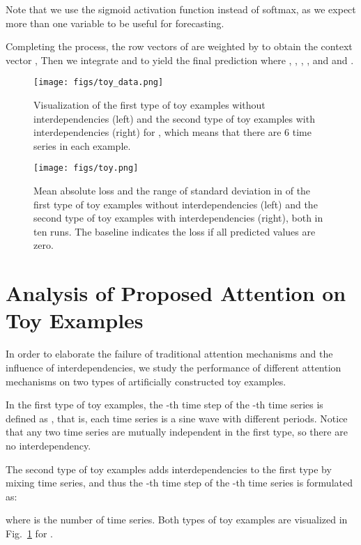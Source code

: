 Note that we use the sigmoid activation function instead of softmax, as we expect more than one variable to be useful for forecasting.

Completing the process, the row vectors of  are weighted by  to obtain the context vector ,  Then we integrate  and  to yield the final prediction
where , , , , and  and .

\begin{figure}[t]
  \centering
  \texttt{[image: figs/toy\_data.png]}
  \caption{Visualization of the first type of toy examples without interdependencies (left) and the second type of toy examples with interdependencies (right) for , which means that there are 6 time series in each example.}
  \label{fig:vis_toy}
\end{figure}

\begin{figure}[t]
  \centering
  \texttt{[image: figs/toy.png]}
  \caption{Mean absolute loss and the range of standard deviation in  of the first type of toy examples without interdependencies (left) and the second type of toy examples with interdependencies (right), both in ten runs. The baseline indicates the loss if all predicted values are zero.}
  \label{fig:toy}
\end{figure}

\section{Analysis of Proposed Attention on Toy Examples} \label{sec:toy_example}
In order to elaborate the failure of traditional attention mechanisms and the influence of interdependencies, we study the performance of different attention mechanisms on two types of artificially constructed toy examples.

In the first type of toy examples, the -th time step of the -th time series is defined as , that is, each time series is a sine wave with different periods.
Notice that any two time series are mutually independent in the first type, so there are no interdependency.

The second type of toy examples adds interdependencies to the first type by mixing time series, and thus the -th time step of the -th time series is formulated as:

where  is the number of time series.
Both types of toy examples are visualized in Fig.~\ref{fig:vis_toy} for .

